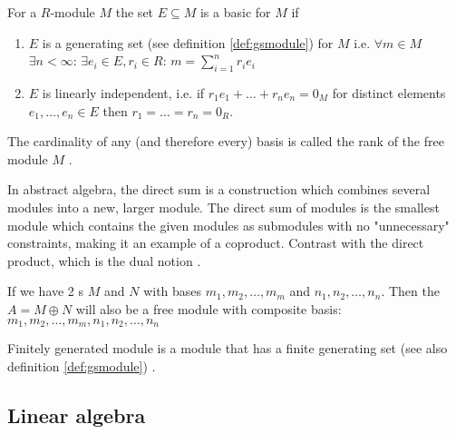 \begin{appendices}
\begin{definition}
  For a $R$-module $M$ the set $E \subseteq M$ is a basic for $M$ if
  \begin{enumerate}
  \item $E$ is a generating set (see definition \ref{def:gsmodule})
    for $M$ i.e. $\forall m \in M$ 
    $\exists n < \infty$: $\exists e_i \in E, r_i \in R$:
    $m = \sum_{i = 1}^n r_i e_i$
  \item $E$ is linearly independent, i.e. if $r_1 e_1 + \dots + r_n
    e_n = 0_M$ for distinct elements $e_1, \dots, e_n \in E$ then
    $r_1 = \dots = r_n = 0_R$.
  \end{enumerate}
  \label{def:freemodule}
\end{definition}

\begin{definition}
  The cardinality of any (and therefore every) basis is called the
  rank of the free module $M$ \cite{wiki:freemodule}.
  \label{def:rankfreemodule}
\end{definition}

\begin{definition}
  In abstract algebra, the direct sum is a construction which combines
  several modules into a new, larger module. The direct sum of modules
  is the smallest module which contains the given modules as
  submodules with no "unnecessary" constraints, making it an example
  of a coproduct. Contrast with the direct product, which is the dual
  notion \cite{wiki:directsummodules}.
  \label{def:directsummodules}
\end{definition}

\begin{example}
  If we have 2 s $M$ and $N$ with bases $m_1,
  m_2, \dots, m_m$ and $n_1, n_2, \dots, n_n$. Then the
   $A = M \oplus N$ will also be a free
  module with composite basis: $m_1, m_2, \dots, m_m, n_1, n_2, \dots, n_n$
  \label{ex:directsummodules}
\end{example}

\begin{definition}
  Finitely generated module is a module that has a finite generating
  set (see also definition \ref{def:gsmodule}) \cite{wiki:fgmodule}.
  \label{def:fgmodule}
\end{definition}

\subsection{Linear algebra}


\end{appendices}
